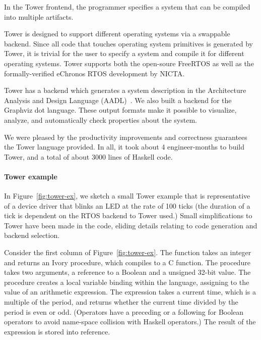 In the Tower frontend, the programmer specifies a system that can be compiled into
multiple artifacts.

Tower is designed to support different operating systems via a swappable
backend. Since all code that touches operating system primitives is generated by
Tower, it is trivial for the user to specify a system and compile it for
different operating systems. Tower supports both the open-soure
FreeRTOS\cite{freertos} as well as the formally-verified
eChronos RTOS\cite{echronos} development by NICTA.


Tower has a backend which generates a system description in the Architecture
Analysis and Design Language (AADL)~\cite{SAE:AADL}. We also built a backend for
the Graphviz dot language.  These output formats make it possible to visualize,
analyze, and automatically check properties about the system.  %

We were pleased by the productivity improvements and correctness guarantees the
Tower language provided. In all, it took about 4 engineer-months to build Tower,
and a total of about 3000 lines of Haskell code.

\paragraph{Tower example}
In Figure~\ref{fig:tower-ex}, we sketch a small Tower example that is
representative of a device driver that blinks an LED at the rate of 100 ticks
(the duration of a tick is dependent on the RTOS backend to Tower used.)  Small
simplifications to Tower have been made in the code, eliding details relating to
code generation and backend selection.

Consider the first column of Figure~\ref{fig:tower-ex}.  The function takes an
integer and returns an Ivory procedure, which compiles to a C function.  The
procedure takes two arguments, a reference to a Boolean and a unsigned 32-bit
value.  The procedure creates a local variable binding within the language,
assigning to  the value of an arithmetic expression.  The expression
takes a current time, which is a multiple of the period, and returns whether the
current time divided by the period is even or odd.  (Operators have a preceding
 or a following  for Boolean operators to avoid name-space collision
with Haskell operators.)  The result of the expression is stored into 
reference.


